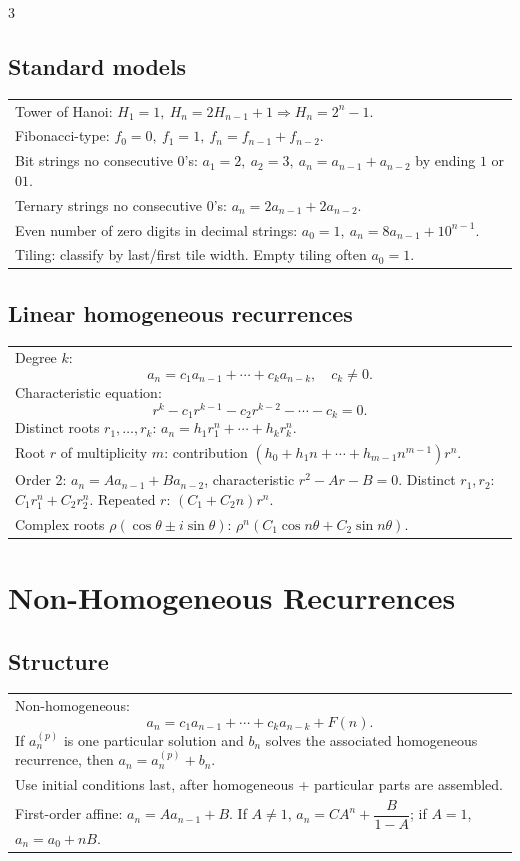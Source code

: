 \documentclass[10pt]{article}
\begin{document}
\begin{multicols*}{3}
\subsection*{Standard models}
\begin{tabular}{@{}p{}@{}}
Tower of Hanoi: \(H_1=1,\ H_n=2H_{n-1}+1\Rightarrow H_n=2^n-1\).\\
Fibonacci-type: \(f_0=0,\ f_1=1,\ f_n=f_{n-1}+f_{n-2}\).\\
Bit strings no consecutive \(0\)'s: \(a_1=2,\ a_2=3,\ a_n=a_{n-1}+a_{n-2}\) by ending \(1\) or \(01\).\\
Ternary strings no consecutive \(0\)'s: \(a_n=2a_{n-1}+2a_{n-2}\).\\
Even number of zero digits in decimal strings: \(a_0=1,\ a_n=8a_{n-1}+10^{n-1}\).\\
Tiling: classify by last/first tile width. Empty tiling often \(a_0=1\).\\
\end{tabular}

\subsection*{Linear homogeneous recurrences}
\begin{tabular}{@{}p{}@{}}
Degree \(k\):
\[
a_n=c_1a_{n-1}+\cdots+c_ka_{n-k},\quad c_k\ne0.
\]
Characteristic equation:
\[
r^k-c_1r^{k-1}-c_2r^{k-2}-\cdots-c_k=0.
\]
Distinct roots \(r_1,\dots,r_k\): \(a_n=h_1r_1^n+\cdots+h_kr_k^n\).\\
Root \(r\) of multiplicity \(m\): contribution \((h_0+h_1n+\cdots+h_{m-1}n^{m-1})r^n\).\\
Order 2: \(a_n=Aa_{n-1}+Ba_{n-2}\), characteristic \(r^2-Ar-B=0\). Distinct \(r_1,r_2\): \(C_1r_1^n+C_2r_2^n\). Repeated \(r\): \((C_1+C_2n)r^n\).\\
Complex roots \(\rho(\cos\theta\pm i\sin\theta)\): \(\rho^n(C_1\cos n\theta+C_2\sin n\theta)\).\\
\end{tabular}

\section*{Non-Homogeneous Recurrences}
\subsection*{Structure}
\begin{tabular}{@{}p{}@{}}
Non-homogeneous:
\[
a_n=c_1a_{n-1}+\cdots+c_ka_{n-k}+F(n).
\]
If \(a_n^{(p)}\) is one particular solution and \(b_n\) solves the associated homogeneous recurrence, then \(a_n=a_n^{(p)}+b_n\).\\
Use initial conditions last, after homogeneous + particular parts are assembled.\\
First-order affine: \(a_n=Aa_{n-1}+B\). If \(A\ne1\), \(a_n=CA^n+\dfrac{B}{1-A}\); if \(A=1\), \(a_n=a_0+nB\).\\
\end{tabular}


\end{multicols*}
\end{document}
